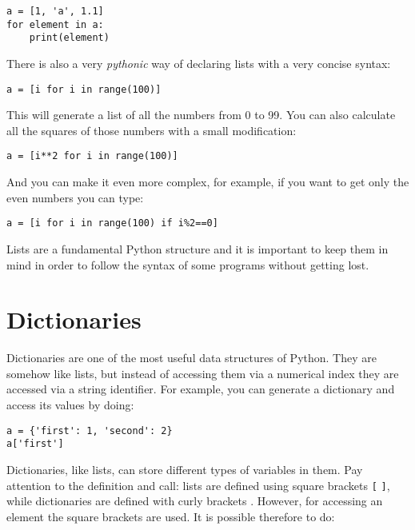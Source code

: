 \begin{verbatim}
a = [1, 'a', 1.1]
for element in a:
    print(element)
\end{verbatim}

There is also a very \emph{pythonic} way of declaring lists with a very
concise syntax:

\begin{verbatim}
a = [i for i in range(100)]
\end{verbatim}

This will generate a list of all the numbers from 0 to 99. You can also
calculate all the squares of those numbers with a small modification:

\begin{verbatim}
a = [i**2 for i in range(100)]
\end{verbatim}

And you can make it even more complex, for example, if you want to get
only the even numbers you can type:

\begin{verbatim}
a = [i for i in range(100) if i%2==0]
\end{verbatim}


Lists are a fundamental Python structure and it is important to keep
them in mind in order to follow the syntax of some programs without
getting lost.

\section{Dictionaries}\label{dictionaries}
Dictionaries are one of the most useful data structures of Python. They
are somehow like lists, but instead of accessing them via a numerical
index they are accessed via a string identifier. For example, you can
generate a dictionary and access its values by doing:

\begin{verbatim}
a = {'first': 1, 'second': 2}
a['first']
\end{verbatim}

Dictionaries, like lists, can store different types of variables in them.
Pay attention to the definition and call: lists are defined using square
brackets \texttt{[} \texttt{]}, while dictionaries are defined with
curly brackets \texttt{{}}. However, for accessing an
element the square brackets are used. It is possible therefore to do:

